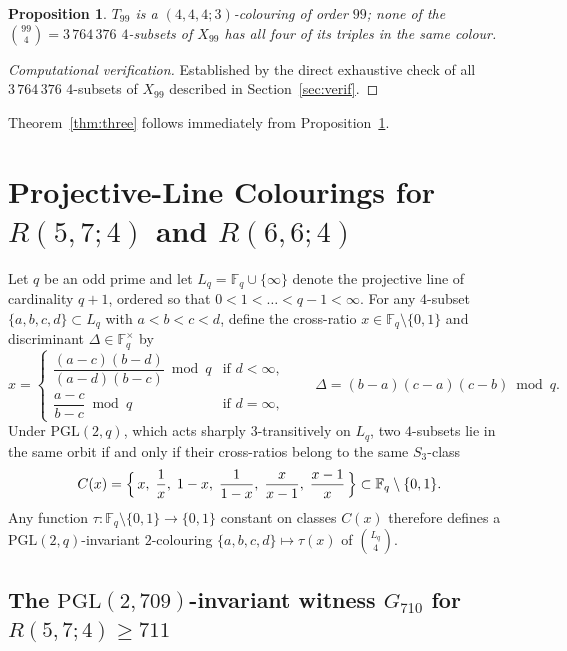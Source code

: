 \documentclass[11pt]{article}
\newtheorem{proposition}[theorem]{Proposition}
\theoremstyle{remark}
\newcommand{\F}{\mathbb{F}}
\begin{document}
\begin{proposition}\label{prop:t99}
$T_{99}$ is a $(4,4,4;3)$-colouring of order $99$; none of the
$\binom{99}{4}=3\,764\,376$ $4$-subsets of $X_{99}$ has all four of its triples
in the same colour.
\end{proposition}

\begin{proof}[Computational verification]
Established by the direct exhaustive check of all $3\,764\,376$ $4$-subsets of
$X_{99}$ described in Section~\ref{sec:verif}.
\end{proof}

Theorem~\ref{thm:three} follows immediately from Proposition~\ref{prop:t99}.

\section{Projective-Line Colourings for $R(5,7;4)$ and $R(6,6;4)$}\label{sec:proj}

Let $q$ be an odd prime and let $L_q=\F_q\cup\{\infty\}$ denote the projective
line of cardinality $q+1$, ordered so that $0<1<\dots<q-1<\infty$. For any
$4$-subset $\{a,b,c,d\}\subset L_q$ with $a<b<c<d$, define the cross-ratio
$x\in\F_q\setminus\{0,1\}$ and discriminant $\Delta\in\F_q^\times$ by
\begin{equation}\label{eq:rule}
  x = \begin{cases}
    \dfrac{(a-c)(b-d)}{(a-d)(b-c)} \bmod q & \text{if } d<\infty,\\[10pt]
    \dfrac{a-c}{b-c} \bmod q & \text{if } d=\infty,
  \end{cases}
  \qquad
  \Delta = (b-a)(c-a)(c-b) \bmod q.
\end{equation}
Under $\mathrm{PGL}(2,q)$, which acts sharply $3$-transitively on $L_q$, two
$4$-subsets lie in the same orbit if and only if their cross-ratios belong to
the same $S_3$-class
\[
  C(x)=\Bigl\{\,x,\;\frac{1}{x},\;1-x,\;\frac{1}{1-x},\;\frac{x}{x-1},\;\frac{x-1}{x}\,\Bigr\}\subset\F_q\setminus\{0,1\}.
\]
Any function $\tau\colon\F_q\setminus\{0,1\}\to\{0,1\}$ constant on classes
$C(x)$ therefore defines a $\mathrm{PGL}(2,q)$-invariant $2$-colouring
$\{a,b,c,d\}\mapsto\tau(x)$ of $\binom{L_q}{4}$.

\subsection{The $\mathrm{PGL}(2,709)$-invariant witness $G_{710}$ for $R(5,7;4)\ge 711$}
\end{document}
